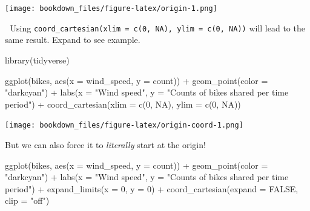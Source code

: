 \documentclass[
]{krantz}
\makeatletter
\newenvironment{Shaded}{\begin{snugshade}}{\end{snugshade}}
\newcommand{\AttributeTok}[1]{\textcolor[rgb]{0.61,0.61,0.61}{#1}}
\newcommand{\ConstantTok}[1]{\textcolor[rgb]{0,0,0}{#1}}
\newcommand{\DecValTok}[1]{\textcolor[rgb]{0.06,0.06,0.06}{#1}}
\newcommand{\FunctionTok}[1]{\textcolor[rgb]{0,0,0}{#1}}
\newcommand{\NormalTok}[1]{#1}
\newcommand{\SpecialCharTok}[1]{\textcolor[rgb]{0,0,0}{#1}}
\newcommand{\StringTok}[1]{\textcolor[rgb]{0.5,0.5,0.5}{#1}}
\newenvironment{kframe}{%
\medskip{}
\setlength{\fboxsep}{.8em}
 \def\at@end@of@kframe{}%
 \ifinner\ifhmode%
  \def\at@end@of@kframe{\end{minipage}}%
  \begin{minipage}{\columnwidth}%
 \fi\fi%
 \def\FrameCommand##1{\hskip\@totalleftmargin \hskip-\fboxsep
 \colorbox{shadecolor}{##1}\hskip-\fboxsep
     \hskip-\linewidth \hskip-\@totalleftmargin \hskip\columnwidth}%
 \MakeFramed {\advance\hsize-\width
   \@totalleftmargin\z@ \linewidth\hsize
   \@setminipage}}%
 {\par\unskip\endMakeFramed%
 \at@end@of@kframe}
\renewenvironment{Shaded}{\begin{kframe}}{\end{kframe}}
\makeatother
\begin{document}
\texttt{[image: bookdown\_files/figure-latex/origin-1.png]}

💁 Using \texttt{coord\_cartesian(xlim\ =\ c(0,\ NA),\ ylim\ =\ c(0,\ NA))} will lead to the same result. Expand to see example.

\begin{Shaded}
\begin{Highlighting}[]
\FunctionTok{library}\NormalTok{(tidyverse)}

\FunctionTok{ggplot}\NormalTok{(bikes, }\FunctionTok{aes}\NormalTok{(}\AttributeTok{x =}\NormalTok{ wind\_speed, }\AttributeTok{y =}\NormalTok{ count)) }\SpecialCharTok{+}
  \FunctionTok{geom\_point}\NormalTok{(}\AttributeTok{color =} \StringTok{"darkcyan"}\NormalTok{) }\SpecialCharTok{+}
  \FunctionTok{labs}\NormalTok{(}\AttributeTok{x =} \StringTok{"Wind speed"}\NormalTok{,}
       \AttributeTok{y =} \StringTok{"Counts of bikes shared per time period"}\NormalTok{) }\SpecialCharTok{+}
  \FunctionTok{coord\_cartesian}\NormalTok{(}\AttributeTok{xlim =} \FunctionTok{c}\NormalTok{(}\DecValTok{0}\NormalTok{, }\ConstantTok{NA}\NormalTok{), }\AttributeTok{ylim =} \FunctionTok{c}\NormalTok{(}\DecValTok{0}\NormalTok{, }\ConstantTok{NA}\NormalTok{))}
\end{Highlighting}
\end{Shaded}

\texttt{[image: bookdown\_files/figure-latex/origin-coord-1.png]}

But we can also force it to \emph{literally} start at the origin!

\begin{Shaded}
\begin{Highlighting}[]
\FunctionTok{ggplot}\NormalTok{(bikes, }\FunctionTok{aes}\NormalTok{(}\AttributeTok{x =}\NormalTok{ wind\_speed, }\AttributeTok{y =}\NormalTok{ count)) }\SpecialCharTok{+}
  \FunctionTok{geom\_point}\NormalTok{(}\AttributeTok{color =} \StringTok{"darkcyan"}\NormalTok{) }\SpecialCharTok{+}
  \FunctionTok{labs}\NormalTok{(}\AttributeTok{x =} \StringTok{"Wind speed"}\NormalTok{,}
       \AttributeTok{y =} \StringTok{"Counts of bikes shared per time period"}\NormalTok{) }\SpecialCharTok{+}
  \FunctionTok{expand\_limits}\NormalTok{(}\AttributeTok{x =} \DecValTok{0}\NormalTok{, }\AttributeTok{y =} \DecValTok{0}\NormalTok{) }\SpecialCharTok{+}
  \FunctionTok{coord\_cartesian}\NormalTok{(}\AttributeTok{expand =} \ConstantTok{FALSE}\NormalTok{, }\AttributeTok{clip =} \StringTok{"off"}\NormalTok{)}
\end{Highlighting}
\end{Shaded}
\end{document}
